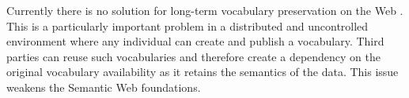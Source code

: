 \documentclass{iosart2c}
\begin{document}
Currently there is no solution for long-term vocabulary preservation on the Web \cite{Baker2013HLT}. This is a particularly important problem in a distributed and uncontrolled environment where any individual can create and publish a vocabulary. Third parties can reuse such vocabularies and therefore create a dependency on the original vocabulary availability as it retains the semantics of the data. This issue weakens the Semantic Web foundations.





\end{document}

